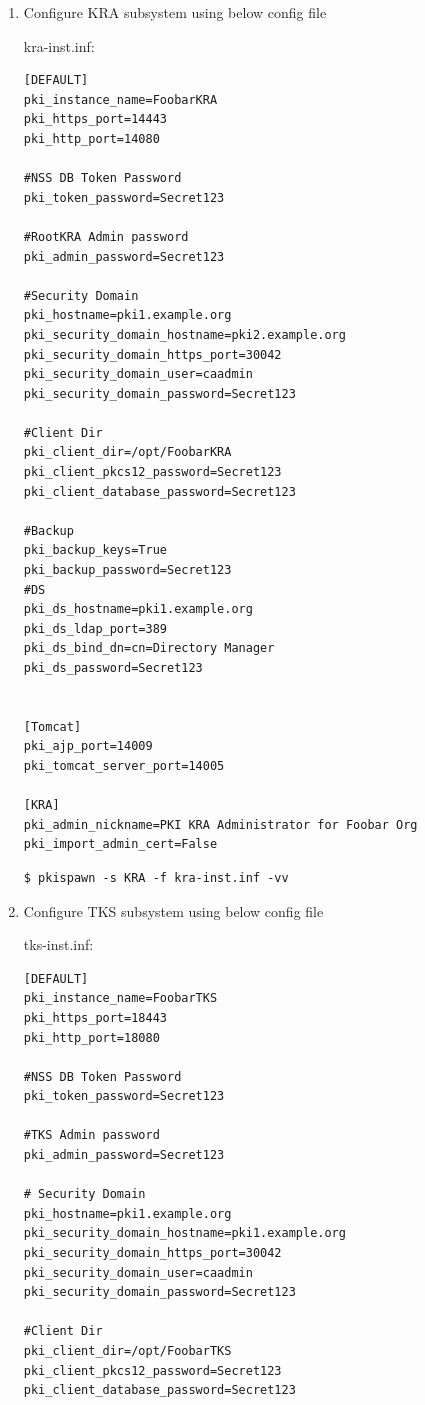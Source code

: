 \documentclass[a4paper]{article}
\begin{document}
\begin{enumerate}[label*=\arabic*.]
\begin{enumerate}[label*=\arabic*.]
            \item Configure KRA subsystem using below config file 

                kra-inst.inf:
                \begin{lstlisting}[style=configFile]
[DEFAULT]
pki_instance_name=FoobarKRA
pki_https_port=14443
pki_http_port=14080

#NSS DB Token Password
pki_token_password=Secret123

#RootKRA Admin password
pki_admin_password=Secret123

#Security Domain
pki_hostname=pki1.example.org
pki_security_domain_hostname=pki2.example.org
pki_security_domain_https_port=30042
pki_security_domain_user=caadmin
pki_security_domain_password=Secret123

#Client Dir
pki_client_dir=/opt/FoobarKRA
pki_client_pkcs12_password=Secret123
pki_client_database_password=Secret123

#Backup
pki_backup_keys=True
pki_backup_password=Secret123
#DS
pki_ds_hostname=pki1.example.org
pki_ds_ldap_port=389
pki_ds_bind_dn=cn=Directory Manager
pki_ds_password=Secret123


[Tomcat]
pki_ajp_port=14009
pki_tomcat_server_port=14005

[KRA]
pki_admin_nickname=PKI KRA Administrator for Foobar Org
pki_import_admin_cert=False
                \end{lstlisting}
                \begin{lstlisting}[style=bashInputStyle]
$ pkispawn -s KRA -f kra-inst.inf -vv 
                \end{lstlisting}
            
            \item Configure TKS subsystem using below config file 

            tks-inst.inf:
            \begin{lstlisting}[style=configFile]
[DEFAULT]
pki_instance_name=FoobarTKS
pki_https_port=18443
pki_http_port=18080

#NSS DB Token Password
pki_token_password=Secret123

#TKS Admin password
pki_admin_password=Secret123

# Security Domain
pki_hostname=pki1.example.org
pki_security_domain_hostname=pki1.example.org
pki_security_domain_https_port=30042
pki_security_domain_user=caadmin
pki_security_domain_password=Secret123

#Client Dir
pki_client_dir=/opt/FoobarTKS
pki_client_pkcs12_password=Secret123
pki_client_database_password=Secret123


\end{lstlisting}
\end{enumerate}
\end{enumerate}
\end{document}
